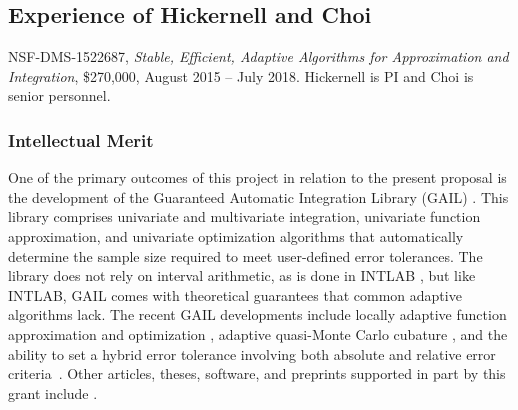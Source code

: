 \documentclass[11pt]{NSFamsart}
\begin{document}
\subsection{Experience of Hickernell and Choi}
NSF-DMS-1522687, \emph{Stable, Efficient, Adaptive Algorithms for Approximation and 
Integration}, \$270,000, August 2015 -- July 2018. \label{SectHickernellPrevious}  Hickernell is PI and Choi is senior personnel.  

\subsubsection{Intellectual Merit}
One of the primary outcomes of this project in relation to the present proposal is the development of the \hypertarget{GAILlink}{Guaranteed Automatic Integration Library (GAIL)} \cite{ChoEtal17b}.  This library comprises univariate and multivariate integration, univariate function approximation, and univariate optimization algorithms that automatically determine the sample size required to meet user-defined error tolerances.  The library does not rely on interval arithmetic, as is done in INTLAB \cite{MoKeCl09, Rum99a, Rum10a}, but like INTLAB, GAIL comes with theoretical guarantees that common adaptive algorithms lack. The recent GAIL developments include locally adaptive function approximation and optimization \cite{ChoEtal17a, Din15a}, adaptive quasi-Monte Carlo cubature \cite{HicJim16a, JimHic16a}, and the ability to set a hybrid error tolerance involving both absolute and relative error criteria~\cite{HicEtal17a}.  Other articles, theses,  software, and preprints supported in part by this grant include 
\cite{ala_augmented_2017, 
	GilEtal16a,
	GilJim16b,
	HicEtal18a,	
	Hic17a,
	JohFasHic18a,
	Li16a,
	Liu17a,
	mccourt_stable_2017,
	mishra_hybrid_nodate,
	mishra_stable_nodate, 
	rashidinia_stable_nodate,
	vu_rbf-fd_nodate,
	Zha17a,
	Zho15a,
	ZhoHic15a}.
    
\end{document}
